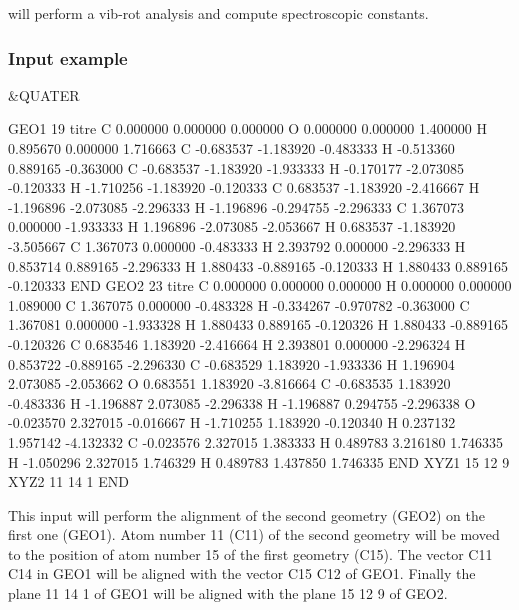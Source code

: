  will perform a vib-{}rot analysis and compute
spectroscopic constants.

\subsubsection{Input example}

\begin{inputlisting}
&QUATER

GEO1
   19
titre
 C     0.000000     0.000000     0.000000
 O     0.000000     0.000000     1.400000
 H     0.895670     0.000000     1.716663
 C    -0.683537    -1.183920    -0.483333
 H    -0.513360     0.889165    -0.363000
 C    -0.683537    -1.183920    -1.933333
 H    -0.170177    -2.073085    -0.120333
 H    -1.710256    -1.183920    -0.120333
 C     0.683537    -1.183920    -2.416667
 H    -1.196896    -2.073085    -2.296333
 H    -1.196896    -0.294755    -2.296333
 C     1.367073     0.000000    -1.933333
 H     1.196896    -2.073085    -2.053667
 H     0.683537    -1.183920    -3.505667
 C     1.367073     0.000000    -0.483333
 H     2.393792     0.000000    -2.296333
 H     0.853714     0.889165    -2.296333
 H     1.880433    -0.889165    -0.120333
 H     1.880433     0.889165    -0.120333
END
GEO2
   23
titre
 C     0.000000     0.000000     0.000000
 H     0.000000     0.000000     1.089000
 C     1.367075     0.000000    -0.483328
 H    -0.334267    -0.970782    -0.363000
 C     1.367081     0.000000    -1.933328
 H     1.880433     0.889165    -0.120326
 H     1.880433    -0.889165    -0.120326
 C     0.683546     1.183920    -2.416664
 H     2.393801     0.000000    -2.296324
 H     0.853722    -0.889165    -2.296330
 C    -0.683529     1.183920    -1.933336
 H     1.196904     2.073085    -2.053662
 O     0.683551     1.183920    -3.816664
 C    -0.683535     1.183920    -0.483336
 H    -1.196887     2.073085    -2.296338
 H    -1.196887     0.294755    -2.296338
 O    -0.023570     2.327015    -0.016667
 H    -1.710255     1.183920    -0.120340
 H     0.237132     1.957142    -4.132332
 C    -0.023576     2.327015     1.383333
 H     0.489783     3.216180     1.746335
 H    -1.050296     2.327015     1.746329
 H     0.489783     1.437850     1.746335
END
XYZ1
15 12 9
XYZ2
11 14 1
END

\end{inputlisting}
This input will perform the alignment of the second geometry (GEO2) on the first one (GEO1).
Atom number 11 (C11) of the second geometry will be moved to the position of atom number
15 of the first geometry (C15).
The vector C11 C14 in GEO1 will be aligned with the vector C15 C12 of GEO1.
Finally the plane 11 14 1 of GEO1 will be aligned with the plane 15 12 9 of GEO2.

